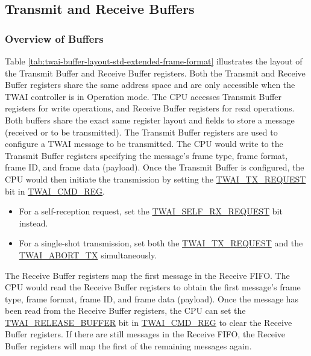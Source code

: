 \documentclass[main\_\_EN.tex]{subfiles}
\begin{document}
\subsection{Transmit and Receive Buffers}
\subsubsection{Overview of Buffers}



Table \ref{tab:twai-buffer-layout-std-extended-frame-format} illustrates the layout of the Transmit Buffer and Receive Buffer registers. Both the Transmit and Receive Buffer registers share the same address space and are only accessible when the TWAI controller is in Operation mode. The CPU accesses Transmit Buffer registers for write operations, and Receive Buffer registers for read operations. Both buffers share the exact same register layout and fields to store a message (received or to be transmitted).
The Transmit Buffer registers are used to configure a TWAI message to be transmitted. The CPU would write to the Transmit Buffer registers specifying the message's frame type, frame format, frame ID, and frame data (payload). Once the Transmit Buffer is configured, the CPU would then initiate the transmission by setting the \hyperref[fielddesc:TWAITXREQUEST]{TWAI\_TX\_REQUEST} bit in \hyperref[regdesc:TWAICMDREG]{TWAI\_CMD\_REG}.

\begin{itemize}
    \item For a self-reception request, set the \hyperref[fielddesc:TWAISELFRXREQUEST]{TWAI\_SELF\_RX\_REQUEST} bit instead.
    \item For a single-shot transmission, set both the \hyperref[fielddesc:TWAITXREQUEST]{TWAI\_TX\_REQUEST} and the \hyperref[fielddesc:TWAIABORTTX]{TWAI\_ABORT\_TX} simultaneously.
\end{itemize}

The Receive Buffer registers map the first message in the Receive FIFO. The CPU would read the Receive Buffer registers to obtain the first message's frame type, frame format, frame ID, and frame data (payload). Once the message has been read from the Receive Buffer registers, the CPU can set the \hyperref[fielddesc:TWAIRELEASEBUFFER]{TWAI\_RELEASE\_BUFFER} bit in \hyperref[regdesc:TWAICMDREG]{TWAI\_CMD\_REG} to clear the Receive Buffer registers. If there are still messages in the Receive FIFO, the Receive Buffer registers will map the first of the remaining messages again.
\end{document}
